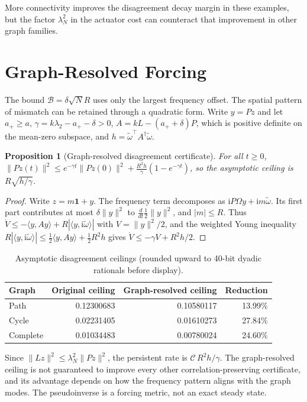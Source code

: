 \documentclass[11pt,notitlepage]{report}
\newtheorem{proposition}[theorem]{Proposition}
\theoremstyle{definition}
\theoremstyle{remark}
\newcommand{\ii}{\mathrm i}
\newcommand{\one}{\mathbf 1}
\begin{document}
More connectivity improves the disagreement decay margin in these examples, but the factor $\lambda_N^2$ in the actuator cost can counteract that improvement in other graph families.

\section{Graph-Resolved Forcing}
The bound $\mathcal B=\delta\sqrt NR$ uses only the largest frequency offset. The spatial pattern of mismatch can be retained through a quadratic form. Write $y=Pz$ and let $a_+\ge a$, $\gamma=k\lambda_2-a_+-\delta>0$, $A=kL-(a_++\delta)P$, which is positive definite on the mean-zero subspace, and $h=\tilde\omega^\top A^\dagger\tilde\omega$.
\begin{proposition}[Graph-resolved disagreement certificate]\label{prop:graphaware}
For all $t\ge0$, $\|Pz(t)\|^2\le e^{-\gamma t}\|Pz(0)\|^2+\tfrac{R^2h}\gamma(1-e^{-\gamma t})$, so the asymptotic ceiling is $R\sqrt{h/\gamma}$.
\end{proposition}
\begin{proof}
Write $z=m\one+y$. The frequency term decomposes as $\ii P\Omega y+\ii m\tilde\omega$. Its first part contributes at most $\delta\|y\|^2$ to $\tfrac{d}{dt}\tfrac12\|y\|^2$, and $|m|\le R$. Thus $\dot V\le-\langle y,Ay\rangle+R|\langle y,\ii\tilde\omega\rangle|$ with $V=\|y\|^2/2$, and the weighted Young inequality $R|\langle y,\ii\tilde\omega\rangle|\le\tfrac12\langle y,Ay\rangle+\tfrac12R^2h$ gives $\dot V\le-\gamma V+R^2h/2$.
\end{proof}
\begin{table}[ht]\centering\small
\caption{Asymptotic disagreement ceilings (rounded upward to 40-bit dyadic rationals before display).}
\begin{tabular}{lrrr}\toprule
Graph&Original ceiling&Graph-resolved ceiling&Reduction\\\midrule
Path&0.12300683&0.10580117&13.99\%\\
Cycle&0.02231405&0.01610273&27.84\%\\
Complete&0.01034483&0.00780024&24.60\%\\\bottomrule
\end{tabular}
\end{table}
Since $\|Lz\|^2\le\lambda_N^2\|Pz\|^2$, the persistent rate is $\mathcal C\,R^2h/\gamma$. The graph-resolved ceiling is not guaranteed to improve every other correlation-preserving certificate, and its advantage depends on how the frequency pattern aligns with the graph modes. The pseudoinverse is a forcing metric, not an exact steady state.
\end{document}
